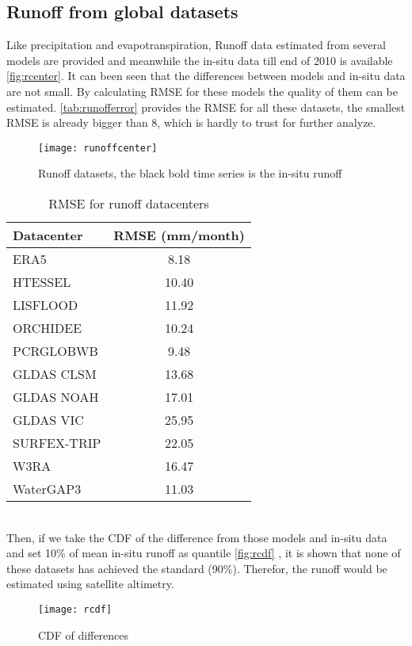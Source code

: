 \subsection{Runoff from global datasets}
Like precipitation and evapotranspiration, Runoff data estimated from several models are provided and meanwhile the in-situ data till end of 2010 is available \autoref{fig:rcenter}. It can been seen that the differences between models and in-situ data are not small.  By calculating RMSE for these models the quality of them can be estimated. \autoref{tab:runofferror} provides the RMSE for all these datasets, the smallest RMSE is already bigger than 8, which is hardly to trust for further analyze. 
\begin{figure}[htbp]\centering
	\centering
	\texttt{[image: runoffcenter]} %
	\caption{Runoff datasets, the black bold time series is the in-situ runoff} 
	\label{fig:rcenter}
\end{figure}
\begin{table}[htbp]\label{tab:rmse} \centering
	\begin{tabular}{|l|c|}
		\hline
		\textbf{Datacenter}  & \textbf{RMSE (mm/month)} \\ \hline
		ERA5        & 8.18  \\ \hline
		HTESSEL     & 10.40 \\ \hline
		LISFLOOD    & 11.92 \\ \hline
		ORCHIDEE    & 10.24 \\ \hline
		PCRGLOBWB   & 9.48  \\ \hline
		GLDAS CLSM  & 13.68 \\ \hline
		GLDAS NOAH  & 17.01 \\ \hline
		GLDAS VIC   & 25.95 \\ \hline
		SURFEX-TRIP & 22.05 \\ \hline
		W3RA        & 16.47 \\ \hline
		WaterGAP3   & 11.03 \\ \hline
	\end{tabular}
	\caption{RMSE for runoff datacenters}
	\label{tab:runofferror}
\end{table}\\
Then, if we take the CDF of the difference from those models and in-situ data and set 10\% of mean in-situ runoff as quantile \autoref{fig:rcdf} , it is shown that none of these datasets has achieved the standard (90\%). Therefor, the runoff would be estimated using satellite altimetry. 
\begin{figure}[htbp]
	\centering
	\texttt{[image: rcdf]} %
	\caption{CDF of differences} 
	\label{fig:rcdf}
\end{figure}\\
